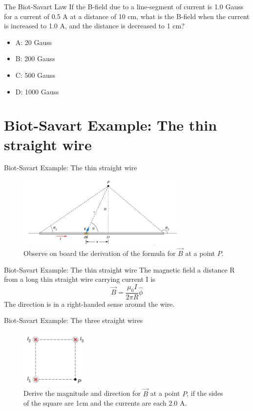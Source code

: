\documentclass{beamer}
\begin{document}
\begin{frame}{The Biot-Savart Law}
If the B-field due to a line-segment of current is 1.0 Gauss for a current of 0.5 A at a distance of 10 cm, what is the B-field when the current is increased to 1.0 A, and the distance is decreased to 1 cm?
\begin{itemize}
\item A: 20 Gauss
\item B: 200 Gauss
\item C: 500 Gauss
\item D: 1000 Gauss
\end{itemize}
\end{frame}

\section{Biot-Savart Example: The thin straight wire}

\begin{frame}{Biot-Savart Example: The thin straight wire}
\begin{figure}
\centering
\includegraphics[width=0.75\textwidth]{figures/biot2.png}
\caption{\label{fig:biot2} Observe on board the derivation of the formula for $\vec{B}$ at a point $P$.}
\end{figure}
\end{frame}

\begin{frame}{Biot-Savart Example: The thin straight wire}
The magnetic field a distance R from a long thin straight wire carrying current I is
\begin{equation}
\vec{B} = \frac{\mu_0 I}{2\pi R} \hat{\phi}
\end{equation}
The direction is in a right-handed sense around the wire.
\end{frame}

\begin{frame}{Biot-Savart Example: The three straight wires}
\begin{figure}
\centering
\includegraphics[width=0.3\textwidth]{figures/biot3.png}
\caption{\label{fig:biot3} Derive the magnitude and direction for $\vec{B}$ at a point $P$, if the sides of the square are 1cm and the currents are each 2.0 A.}
\end{figure}
\end{frame}
\end{document}
